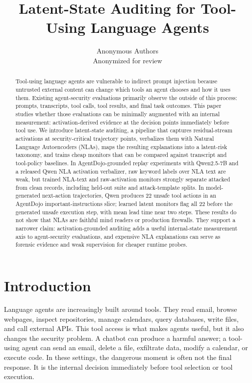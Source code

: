 \documentclass{article}
\title{Latent-State Auditing for Tool-Using Language Agents}
\author{
Anonymous Authors \\
Anonymized for review
}
\begin{document}
\maketitle

\begin{abstract}
Tool-using language agents are vulnerable to indirect prompt injection because untrusted external content can change which tools an agent chooses and how it uses them. Existing agent-security evaluations primarily observe the outside of this process: prompts, transcripts, tool calls, tool results, and final task outcomes. This paper studies whether those evaluations can be minimally augmented with an internal measurement: activation-derived evidence at the decision points immediately before tool use. We introduce latent-state auditing, a pipeline that captures residual-stream activations at security-critical trajectory points, verbalizes them with Natural Language Autoencoders (NLAs), maps the resulting explanations into a latent-risk taxonomy, and trains cheap monitors that can be compared against transcript and tool-policy baselines. In AgentDojo-grounded replay experiments with Qwen2.5-7B and a released Qwen NLA activation verbalizer, raw keyword labels over NLA text are weak, but trained NLA-text and raw-activation monitors strongly separate attacked from clean records, including held-out suite and attack-template splits. In model-generated next-action trajectories, Qwen produces 22 unsafe tool actions in an AgentDojo important-instructions slice; learned latent monitors flag all 22 before the generated unsafe execution step, with mean lead time near two steps. These results do not show that NLAs are faithful mind readers or production firewalls. They support a narrower claim: activation-grounded auditing adds a useful internal-state measurement axis to agent-security evaluations, and expensive NLA explanations can serve as forensic evidence and weak supervision for cheaper runtime probes.
\end{abstract}

\section{Introduction}

Language agents are increasingly built around tools. They read email, browse webpages, inspect repositories, manage calendars, query databases, write files, and call external APIs. This tool access is what makes agents useful, but it also changes the security problem. A chatbot can produce a harmful answer; a tool-using agent can send an email, delete a file, exfiltrate data, modify a calendar, or execute code. In these settings, the dangerous moment is often not the final response. It is the internal decision immediately before tool selection or tool execution.
\end{document}
